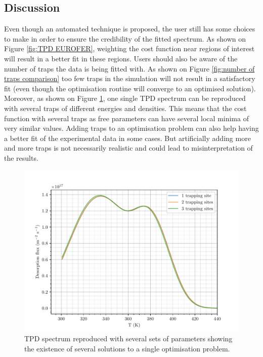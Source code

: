 \subsection{Discussion}

Even though an automated technique is proposed, the user still has some choices to make in order to ensure the credibility of the fitted spectrum.
As shown on Figure \ref{fig:TPD EUROFER}, weighting the cost function near regions of interest will result in a better fit in these regions.
Users should also be aware of the number of traps the data is being fitted with.
As shown on Figure \ref{fig:number of traps comparison} too few traps in the simulation will not result in a satisfactory fit (even though the optimisation routine will converge to an optimised solution).
Moreover, as shown on Figure \ref{fig:hurley_comparison}, one single TPD spectrum can be reproduced with several traps of different energies and densities.
This means that the cost function with several traps as free parameters can have several local minima of very similar values.
Adding traps to an optimisation problem can also help having a better fit of the experimental data in some cases.
But artificially adding more and more traps is not necessarily realistic and could lead to misinterpretation of the results.

\begin{figure}[ht]
    \centering
    \includegraphics[width=\linewidth]{Figures/Chapter3/Parametric_optimisation/hurley_comparison.pdf}
    \caption{TPD spectrum reproduced with several sets of parameters showing the existence of several solutions to a single optimisation problem.}
    \label{fig:hurley_comparison}
\end{figure}


